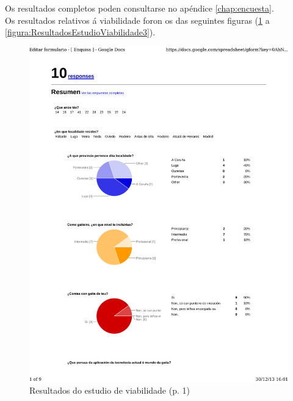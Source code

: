 Os resultados completos poden consultarse no apéndice \ref{chap:encuesta}.\\

Os resultados relativos á viabilidade foron os das seguintes figuras
(\ref{figura:ResultadosEstudioViabilidade1} a
\ref{figura:ResultadosEstudioViabilidade3}).\\

\begin{figure}[htbp]
 \centering
 \includegraphics[scale=0.7,page=1,keepaspectratio=true]{./imagenes/enquisa.pdf}
 \caption{Resultados do estudio de viabilidade (p. 1)}
 \label{figura:ResultadosEstudioViabilidade1}
\end{figure}

